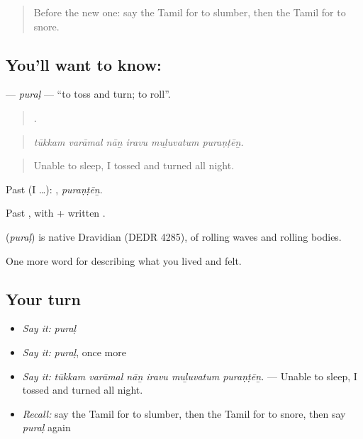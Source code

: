 \label{lesson:TA-C489-pural}



\begin{quote}
Before the new one: say the Tamil for to slumber, then the Tamil for to snore.
\end{quote}

\subsection*{You'll want to know: }
\textbf{} — \emph{puraḷ} — \textquotedblleft{}to toss and turn; to roll\textquotedblright{}.

\begin{quote}
     .
\end{quote}

\begin{quote}
\emph{tūkkam varāmal nāṉ iravu muḻuvatum puraṇṭēṉ.}
\end{quote}

\begin{quote}
Unable to sleep, I tossed and turned all night.
\end{quote}

Past (I …): , \emph{puraṇṭēṉ}.

Past , with  +  written .

\begin{cousinweb}
\textbf{} (\emph{puraḷ}) is native Dravidian (DEDR 4285), of rolling waves and rolling bodies.
\end{cousinweb}

\begin{grammarlens}[title={What you've built}]
One more word for describing what you lived and felt.
\end{grammarlens}

\subsection*{Your turn}
\begin{itemize}
\raggedright
  \item \emph{Say it:} \emph{puraḷ}
  \item \emph{Say it:} \emph{puraḷ}, once more
  \item \emph{Say it:} \emph{tūkkam varāmal nāṉ iravu muḻuvatum puraṇṭēṉ.} — Unable to sleep, I tossed and turned all night.
  \item \emph{Recall:} say the Tamil for to slumber, then the Tamil for to snore, then say \emph{puraḷ} again
\end{itemize}


